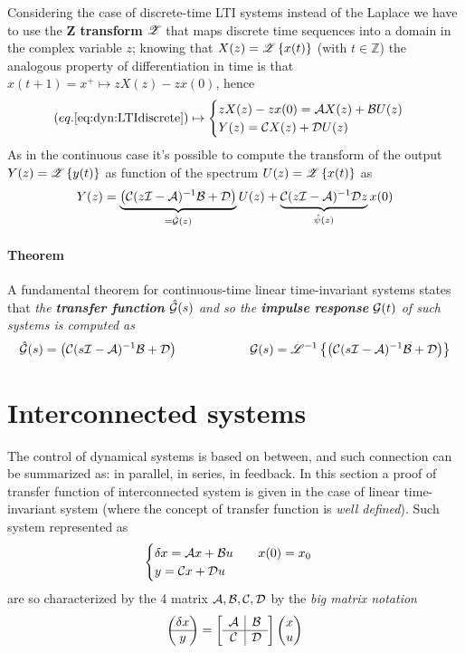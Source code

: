 	Considering the case of discrete-time LTI  systems instead of the Laplace we have to use the \textbf{Z transform} $\mathscr{Z}$ that maps discrete time sequences into a domain in the complex variable $z$; knowing that $X(z) = \mathscr{Z}\left\{x(t)\right\}$ (with $t\in \mathds Z$) the analogous property of differentiation in time is that $x(t+1) = x^+ \mapsto z X(z) - z x(0)$, hence
	\begin{equation}
		(eq.\ref{eq:dyn:LTIdiscrete} )\mapsto \begin{cases}
			z X(z) - z x(0) = \mathcal{A} X(z) + \mathcal{B} U(z) \\ Y(z) = \mathcal{C} X(z) + \mathcal{D} U(z)
		\end{cases}
	\end{equation}
	As in the continuous case it's possible to compute the transform of the output $Y(z) = \mathscr{Z}\left\{y(t)\right\}$ as function of the spectrum $U(z) = \mathscr{Z}\left\{x(t)\right\}$ as
	\begin{equation}
		Y(z) = \underbrace{\left(\mathcal{C} (z\mathcal{I} - \mathcal{A})^{-1} \mathcal{B} + \mathcal{D}\right)}_{= \hat {\mathcal{G}}(z)} U(z) + \underbrace{\mathcal{C}(z\mathcal{I}-\mathcal{A})^{-1} \mathcal{D} z}_{\hat \psi(z)} x(0)
	\end{equation}

	\paragraph{Theorem} A fundamental theorem for continuous-time linear time-invariant systems states that \textit{the \textbf{transfer function} $\hat {\mathcal{G}}(s)$ and so the \textbf{impulse response} $\mathcal{G}(t)$ of such systems is computed as}
	\begin{equation}
		\hat {\mathcal{G}}(s) = \left(\mathcal{C} (s\mathcal{I} - \mathcal{A})^{-1} \mathcal{B} + \mathcal{D}\right) \hspace{2cm} \mathcal{G}(s) = \mathscr{L}^{-1} \left\{ \left(\mathcal{C} (s\mathcal{I} - \mathcal{A})^{-1} \mathcal{B} + \mathcal{D}\right) \right\}
	\end{equation}
	
\section{Interconnected systems}
	The control of dynamical systems is based on  between, and such connection can be summarized as: in parallel, in series, in feedback. In this section a proof of transfer function of interconnected system is given in the case of linear time-invariant system (where the concept of transfer function is \textit{well defined}). Such system represented as 
	\[ \begin{cases}
		\delta x = \mathcal{A} x + \mathcal{B} u \qquad x(0) = x_0\\ y = \mathcal{C} x + \mathcal{D} u 
	\end{cases} \]
	are so characterized by the 4 matrix $\mathcal{A},\mathcal{B},\mathcal{C},\mathcal{D}$ by the \textit{big matrix notation}
	\[ \begin{pmatrix} \delta x \\ \hline y \end{pmatrix} = \begin{bmatrix}
		\begin{array}{c | c}
			\mathcal{A} & \mathcal{B} \\ \hline \mathcal{C} & \mathcal{D}
		\end{array} 
	\end{bmatrix} \begin{pmatrix} x \\ u  \end{pmatrix}\]
	
